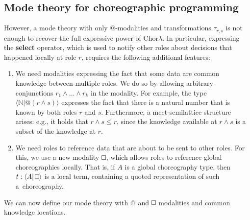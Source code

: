 \documentclass{scrartcl}
\renewcommand{\square}{\mathop{\mathchoice%
  {\tikz{\draw (0,0) rectangle (0.2cm,0.2cm);}}%
  {\tikz{\draw (0,0) rectangle (0.2cm,0.2cm);}}%
  {\tikz{\draw (0,0) rectangle (0.15cm,0.15cm);}}%
  {\tikz{\draw (0,0) rectangle (0.10cm,0.10cm);}}}}
\theoremstyle{definition}
\theoremstyle{plain}
\begin{document}
\subsection{Mode theory for choreographic programming}
However, a mode theory with only $@$-modalities and transformations
$\tau_{r,s}$ is not enough to recover the full expressive power of
Chor$\lambda$. In particular, expressing the \textbf{select} operator, which is
used to notify other roles about decisions that happened locally at role $r$,
requires the following additional features:
\begin{enumerate}
\item
  We need modalities expressing the fact that some data are common knowledge
  between multiple roles. We do so by allowing arbitrary conjunctions $r_1
  \land \ldots \land r_k$ in the modality. For example, the type $\langle
  \mathbb{N} | @(r\land s) \rangle$ expresses the fact that there is a natural
  number that is known by both roles $r$ and $s$. Furthermore, a
  meet-semilattice structure arises: e.g., it holds that $r \land s \leq r$,
  since the knowledge available at $r \land s$ is a subset of the knowledge at
  $r$.
\item
  We need roles to reference data that are about to be sent to other roles. For
  this, we use a new modality $\square$, which allows roles to reference global
  choreographies locally. That is, if $A$ is a global choreography type, then
  $t : \langle A | \square \rangle$ is a local term, containing a quoted
  representation of such a~choreography.
\end{enumerate}
We can now define our mode theory with $@$ and $\square$ modalities and common
knowledge locations.
\end{document}

